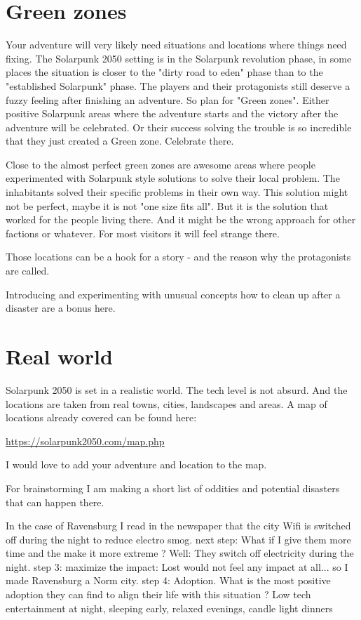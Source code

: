 \section{Green zones}

Your adventure will very likely need situations and locations where things need fixing. The Solarpunk 2050 setting is in the Solarpunk revolution phase, in some places the situation is closer to the "dirty road to eden" phase than to the "established Solarpunk" phase. The players and their protagonists still deserve a fuzzy feeling after finishing an adventure. So plan for "Green zones". Either positive Solarpunk areas where the adventure starts and the victory after the adventure will be celebrated. Or their success solving the trouble is so incredible that they just created a Green zone. Celebrate there.

Close to the almost perfect green zones are awesome areas where people experimented with Solarpunk style solutions to solve their local problem. The inhabitants solved their specific problems in their own way. This solution might not be perfect, maybe it is not "one size fits all". But it is the solution that worked for the people living there. And it might be the wrong approach for other factions or whatever. For most visitors it will feel strange there.

Those locations can be a hook for a story - and the reason why the protagonists are called.

Introducing and experimenting with unusual concepts how to clean up after a disaster are a bonus here.

\section{Real world}

Solarpunk 2050 is set in a realistic world. The tech level is not absurd. And the locations are taken from real towns, cities, landscapes and areas. A map of locations already covered can be found here:\newline

\href{https://solarpunk2050.com/map.php}{https://solarpunk2050.com/map.php} \newline

I would love to add your adventure and location to the map.

For brainstorming I am making a short list of oddities and potential disasters that can happen there.

In the case of Ravensburg I read in the newspaper that the city Wifi is switched off during the night to reduce electro smog.
next step: What if I give them more time and the make it more extreme ? Well: They switch off electricity during the night.
step 3: maximize the impact: Lost would not feel any impact at all... so I made Ravensburg a Norm city.
step 4: Adoption. What is the most positive adoption they can find to align their life with this situation ? Low tech entertainment at night, sleeping early, relaxed evenings, candle light dinners

